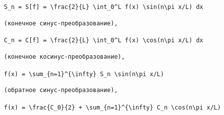 \documentclass[
  ukrainian,
]{article}
\begin{document}
\texttt{S\_n\ =\ S{[}f{]}\ =\ \textbackslash{}frac\{2\}\{L\}\ \textbackslash{}int\_0\^{}L\ f(x)\ \textbackslash{}sin(n\textbackslash{}pi\ x/L)\ dx}

\begin{verbatim}
(конечное синус-преобразование),
\end{verbatim}

\texttt{C\_n\ =\ C{[}f{]}\ =\ \textbackslash{}frac\{2\}\{L\}\ \textbackslash{}int\_0\^{}L\ f(x)\ \textbackslash{}cos(n\textbackslash{}pi\ x/L)\ dx}

\begin{verbatim}
(конечное косинус-преобразование),
\end{verbatim}

\texttt{f(x)\ =\ \textbackslash{}sum\_\{n=1\}\^{}\{\textbackslash{}infty\}\ S\_n\ \textbackslash{}sin(n\textbackslash{}pi\ x/L)}

\begin{verbatim}
(обратное синус-преобразование),
\end{verbatim}

\texttt{f(x)\ =\ \textbackslash{}frac\{C\_0\}\{2\}\ +\ \textbackslash{}sum\_\{n=1\}\^{}\{\textbackslash{}infty\}\ C\_n\ \textbackslash{}cos(n\textbackslash{}pi\ x/L)}
\end{document}
